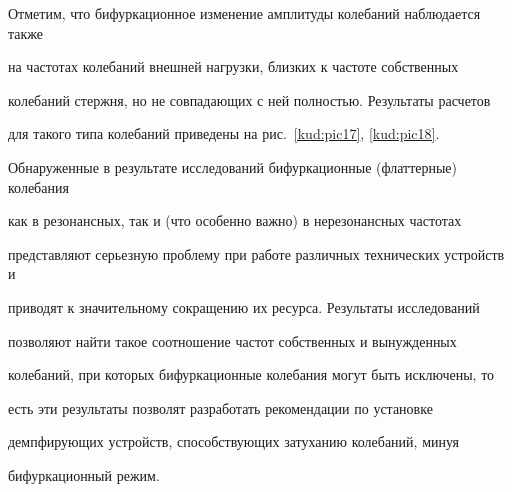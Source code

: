 Отметим, что бифуркационное изменение амплитуды колебаний наблюдается также

на частотах колебаний внешней нагрузки, близких к частоте собственных

колебаний стержня, но не совпадающих с ней полностью. Результаты расчетов

для такого типа колебаний приведены на рис.~\ref{kud:pic17}, \ref{kud:pic18}.



Обнаруженные в результате исследований бифуркационные (флаттерные) колебания

как в резонансных, так и (что особенно важно) в нерезонансных частотах

представляют серьезную проблему при работе различных технических устройств и

приводят к значительному сокращению их ресурса. Результаты исследований

позволяют найти такое соотношение частот собственных и вынужденных

колебаний, при которых бифуркационные колебания могут быть исключены, то

есть эти результаты позволят разработать рекомендации по установке

демпфирующих устройств, способствующих затуханию колебаний, минуя

бифуркационный режим.







